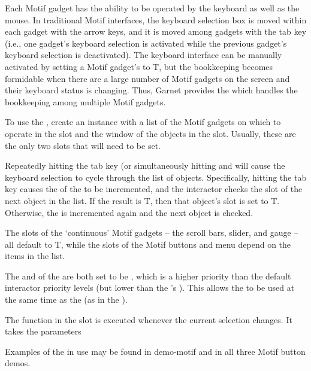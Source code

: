 Each Motif gadget has the ability to be operated by the keyboard as
well as the mouse.  In traditional Motif interfaces, the keyboard
selection box is moved within each gadget with the arrow keys, and it
is moved among gadgets with the tab key (i.e., one gadget's keyboard
selection is activated while the previous gadget's keyboard selection
is deactivated).  The keyboard interface can be manually
activated by setting a Motif gadget's  to T, but the
bookkeeping becomes formidable when there are a large number of Motif
gadgets on the screen and their keyboard status is changing.
Thus, Garnet provides the  which handles the bookkeeping
among multiple Motif gadgets.

To use the , create an instance with
a list of the Motif gadgets on which to operate in the
 slot and the window of the objects in the 
slot.  Usually, these are the only two slots that will need to be set.

Repeatedly hitting the tab key (or simultaneously hitting  and
 will cause the keyboard selection to cycle through the list of
objects.  Specifically, hitting the tab key causes the
 of the  to be incremented, and the interactor
checks the  slot of the next object in the  list.
If the result is T, then that object's  slot is
set to T.  Otherwise, the  is incremented again and the next object
is checked.

The  slots of the `continuous' Motif gadgets -- the scroll bars,
slider, and gauge -- all default to T, while the  slots of the
Motif buttons and menu depend on the items in the  list.

The  and  of the
 are both set to be ,
which is a higher priority than the default interactor priority levels
(but lower than the 's ).  This
allows the  to be used at the same time as the
 (as in the ).

The function in the  slot is executed whenever the
current selection changes.  It takes the parameters

Examples of the  in use may be found in demo-motif
and in all three Motif button demos.



